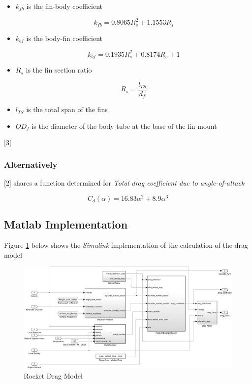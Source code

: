 \documentclass[]{article}
\providecommand{\tightlist}{%
  \setlength{\itemsep}{0pt}\setlength{\parskip}{0pt}}
\begin{document}
\begin{itemize}
\tightlist
\item
  \(k_{fb}\) is the fin-body coefficient

  \begin{equation}
  \label{eq_fin_body_coef_aoa}
  k_{fb} = 0.8065 R^2_s + 1.1553 R_s
  \end{equation}
\item
  \(k_{bf}\) is the body-fin coefficient

  \begin{equation}
  \label{eq_body_fin_coef_aoa}
  k_{bf} = 0.1935 R^2_s + 0.8174 R_s + 1
  \end{equation}
\item
  \(R_s\) is the fin section ratio

  \begin{equation}
  \label{eq_fin_section_ratio}
  R_s = \dfrac{l_{TS}}{d_f}
  \end{equation}
\item
  \(l_{TS}\) is the total span of the fins
\item
  \(OD_f\) is the diameter of the body tube at the base of the fin mount
\end{itemize}

{[}3{]}

\subsubsection{Alternatively}\label{alternatively}

{[}2{]} shares a function determined for \emph{Total drag coefficient
due to angle-of-attack}

\begin{equation}
\label{eq_darg_total_aoa}
C_d (\alpha) = 16.83 \alpha^2 + 8.9 \alpha^3
\end{equation}

\subsection{Matlab Implementation}\label{matlab-implementation}

Figure \ref{rocket_drag_model_label} below shows the \emph{Simulink}
implementation of the calculation of the drag model

\begin{figure}[htbp]
\centering
\includegraphics{images/rocket_drag_model.png}
\caption{Rocket Drag Model\label{rocket_drag_model_label}}
\end{figure}
\end{document}
